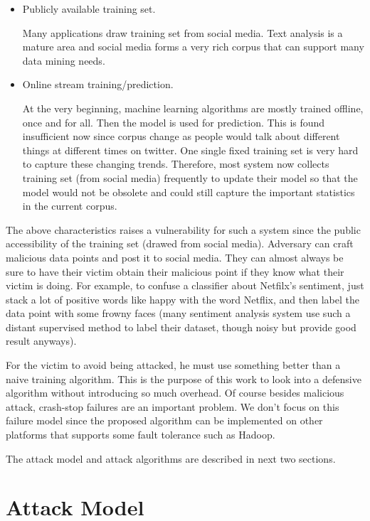 \documentclass[10pt,conference,compsocconf,letterpaper]{IEEEtran}
\begin{document}
\begin{itemize}
\item Publicly available training set. 

Many applications draw training set from social media. Text analysis is a mature area and social media forms a very rich corpus that can support many data mining needs.

\item Online stream training/prediction.

At the very beginning, machine learning algorithms are mostly trained offline, once and for all. Then the model is used for prediction. This is found insufficient now since corpus change as people would talk about different things at different times on twitter. One single fixed training set is very hard to capture these changing trends. Therefore, most system now collects training set (from social media) frequently to update their model so that the model would not be obsolete and could still capture the important statistics in the current corpus.
\end{itemize}

The above characteristics raises a vulnerability for such a system since the public accessibility of the training set (drawed from social media). Adversary can craft malicious data points and post it to social media. They can almost always be sure to have their victim obtain their malicious point if they know what their victim is doing. For example, to confuse a classifier about Netfilx's sentiment, just stack a lot of positive words like happy with the word Netflix, and then label the data point with some frowny faces (many sentiment analysis system use such a distant supervised method to label their dataset, though noisy but provide good result anyways). 

For the victim to avoid being attacked, he must use something better than a naive training algorithm. This is the purpose of this work to look into a defensive algorithm without introducing so much overhead. Of course besides malicious attack, crash-stop failures are an important problem. We don't focus on this failure model since the proposed algorithm can be implemented on other platforms that supports some fault tolerance such as Hadoop.

The attack model and attack algorithms are described in next two sections.

\section{Attack Model}
\end{document}
